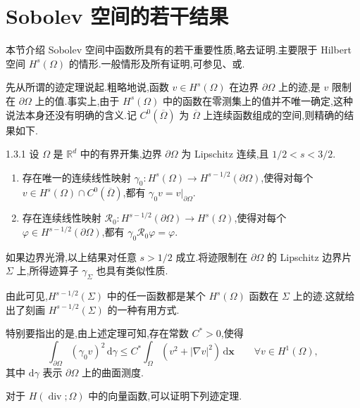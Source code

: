 \section{Sobolev 空间的若干结果}\label{sec:1.3}

本节介绍 Sobolev 空间中函数所具有的若干重要性质,略去证明.主要限于 Hilbert 空间 \(H^s(\Omega)\) 的情形.一般情形及所有证明,可参见、或.

先从所谓的迹定理说起.粗略地说,函数 \(v\in H^s(\Omega)\) 在边界 \(\partial\Omega\) 上的迹,是 \(v\) 限制在 \(\partial\Omega\) 上的值.事实上,由于 \(H^s(\Omega)\) 中的函数在零测集上的值并不唯一确定,这种说法本身还没有明确的含义.记 \(C^0(\overline\Omega)\) 为 \(\overline\Omega\) 上连续函数组成的空间,则精确的结果如下.

\begin{theorem}[迹定理]{1.3.1}
设 \(\Omega\) 是 \(\mathbb R^d\) 中的有界开集,边界 \(\partial\Omega\) 为 Lipschitz 连续,且 \(1/2<s<3/2\).
\begin{enumerate}[label=\alph*.,leftmargin=*]
  \item 存在唯一的连续线性映射 \(\gamma_0\colon H^s(\Omega)\to H^{s-1/2}(\partial\Omega)\),使得对每个 \(v\in H^s(\Omega)\cap C^0(\overline\Omega)\),都有 \(\gamma_0v=v|_{\partial\Omega}\).
  \item 存在连续线性映射 \(\mathcal R_0\colon H^{s-1/2}(\partial\Omega)\to H^s(\Omega)\),使得对每个 \(\varphi\in H^{s-1/2}(\partial\Omega)\),都有 \(\gamma_0\mathcal R_0\varphi=\varphi\).
\end{enumerate}
如果边界光滑,以上结果对任意 \(s>1/2\) 成立.将迹限制在 \(\partial\Omega\) 的 Lipschitz 边界片 \(\Sigma\) 上,所得迹算子 \(\gamma_\Sigma\) 也具有类似性质.
\end{theorem}

由此可见,\(H^{s-1/2}(\Sigma)\) 中的任一函数都是某个 \(H^s(\Omega)\) 函数在 \(\Sigma\) 上的迹.这就给出了刻画 \(H^{s-1/2}(\Sigma)\) 的一种有用方式.

特别要指出的是,由上述定理可知,存在常数 \(C^*>0\),使得
\begin{equation}\label{eq:1.3.1}
  \int_{\partial\Omega}(\gamma_0v)^2\,\mathrm d\gamma
  \le C^*\int_\Omega (v^2+|\nabla v|^2)\,\mathrm d\boldsymbol{x}
  \qquad \forall v\in H^1(\Omega),
\end{equation}
其中 \(\mathrm d\gamma\) 表示 \(\partial\Omega\) 上的曲面测度.

对于 \(H(\operatorname{div};\Omega)\) 中的向量函数,可以证明下列迹定理.

